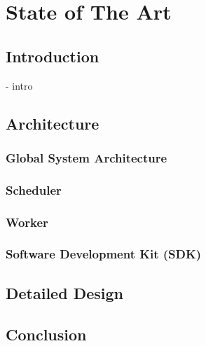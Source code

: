 

\chapter{State of The Art}

\ifpdf
    \graphicspath{{Chapter3/Figs/Raster/}{Chapter3/Figs/PDF/}{Chapter3/Figs/}}
\else
    \graphicspath{{Chapter3/Figs/Vector/}{Chapter3/Figs/}}
\fi


\section{Introduction}
- intro

\section{Architecture}
    \subsection{Global System Architecture}
    \subsection{Scheduler}
    \subsection{Worker}
    \subsection{Software Development Kit (SDK)}

\section{Detailed Design}

\section{Conclusion}
